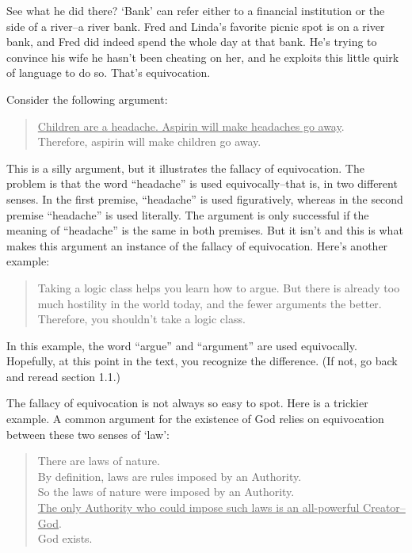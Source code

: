 See what he did there? `Bank' can refer either to a financial institution or the side of a river--a
river bank. Fred and Linda's favorite picnic spot is on a river bank, and Fred did indeed spend the
whole day at that bank. He's trying to convince his wife he hasn't been cheating on her, and he
exploits this little quirk of language to do so. That's equivocation.

Consider the following argument:

 \begin{quote}
       \underline{Children are a headache. Aspirin will make headaches go away}. \\
        Therefore, aspirin will make children go away.
\end{quote}

This is a silly argument, but it illustrates the fallacy of equivocation. The problem
is that the word ``headache'' is used equivocally--that is, in two different senses.
In the first premise, ``headache'' is used figuratively, whereas in the second
premise ``headache'' is used literally. The argument is only successful if the
meaning of ``headache'' is the same in both premises. But it isn't and this is
what makes this argument an instance of the fallacy of equivocation.
Here's another example:

\begin{quote}
        Taking a logic class helps you learn how to argue. But there is already
        too much hostility in the world today, and the fewer arguments the better.
        Therefore, you shouldn't take a logic class.
\end{quote}

In this example, the word ``argue'' and ``argument'' are used equivocally.
Hopefully, at this point in the text, you recognize the difference. (If not, go back
and reread section 1.1.)

The fallacy of equivocation is not always so easy to spot. Here is a trickier
example. A common argument for the existence of God relies on equivocation between these two senses of
`law': \\
\begin{quote}
        There are laws of nature. \\
        By definition, laws are rules imposed by an Authority. \\
        So the laws of nature were imposed by an Authority. \\
        \underline{The only Authority who could impose such laws is an all-powerful Creator--God}. \\
        God exists.
\end{quote}

